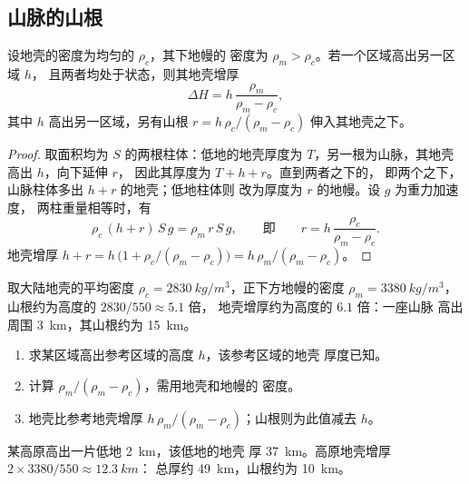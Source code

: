 \subsection{山脉的山根}

\begin{proposition}[艾里地壳均衡]\label{prop:g11:lithosphere-asthenosphere:airy}
设地壳的密度为均匀的 $\rho_c$，其下地幔的
密度为 $\rho_m > \rho_c$。若一个区域高出另一区域 $h$，
且两者均处于状态，则其地壳增厚
\[
  \Delta H = h\,\frac{\rho_m}{\rho_m - \rho_c},
\]
其中 $h$ 高出另一区域，另有山根
$r = h\,\rho_c/(\rho_m - \rho_c)$ 伸入其地壳之下。
\end{proposition}

\begin{proof}
取面积均为 $S$ 的两根柱体：低地的地壳厚度为
$T$，另一根为山脉，其地壳高出 $h$，向下延伸 $r$，
因此其厚度为 $T + h + r$。直到两者之下的，
即两个之下，山脉柱体多出 $h + r$ 的地壳；低地柱体则
改为厚度为 $r$ 的地幔。设 $g$ 为重力加速度，
两柱重量相等时，有
\[
  \rho_c\,(h + r)\,S\,g = \rho_m\,r\,S\,g,
  \qquad\text{即}\qquad
  r = h\,\frac{\rho_c}{\rho_m - \rho_c}.
\]
地壳增厚 $h + r = h\,\bigl(1 + \rho_c/(\rho_m - \rho_c)\bigr)
= h\,\rho_m/(\rho_m - \rho_c)$。
\end{proof}

取大陆地壳的平均密度 $\rho_c =
\qty{2830}{kg/m^3}$，正下方地幔的密度 $\rho_m =
\qty{3380}{kg/m^3}$，山根约为高度的 $2830/550 \approx 5.1$ 倍，
地壳增厚约为高度的 $6.1$ 倍：一座山脉
高出周围 \qty{3}{km}，其山根约为 \qty{15}{km}。

\begin{method}[计算山根]\label{met:g11:lithosphere-asthenosphere:root}
\begin{enumerate}
  \item 求某区域高出参考区域的高度 $h$，该参考区域的地壳
        厚度已知。
  \item 计算 $\rho_m/(\rho_m - \rho_c)$，需用地壳和地幔的
        密度。
  \item 地壳比参考地壳增厚 $h\,\rho_m/(\rho_m -
        \rho_c)$；山根则为此值减去 $h$。
\end{enumerate}
\end{method}

\begin{example}\label{ex:g11:lithosphere-asthenosphere:plateau}
某高原高出一片低地 \qty{2}{km}，该低地的地壳
厚 \qty{37}{km}。高原地壳增厚 $2 \times 3380/550 \approx \qty{12.3}{km}$：
总厚约 \qty{49}{km}，山根约为 \qty{10}{km}。
\end{example}

